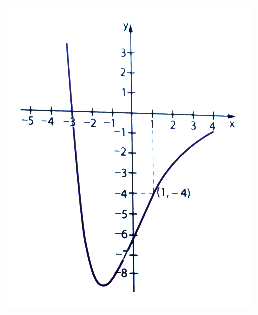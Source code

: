 \documentclass[a4paper,14pt]{article}
\begin{document}
\begin{multicols}{2}
\begin{enumerate}
        	\includegraphics[width=1\linewidth]{imagens_8FMA71/imagem3}
        \end{enumerate}

\end{multicols}
\end{document}
